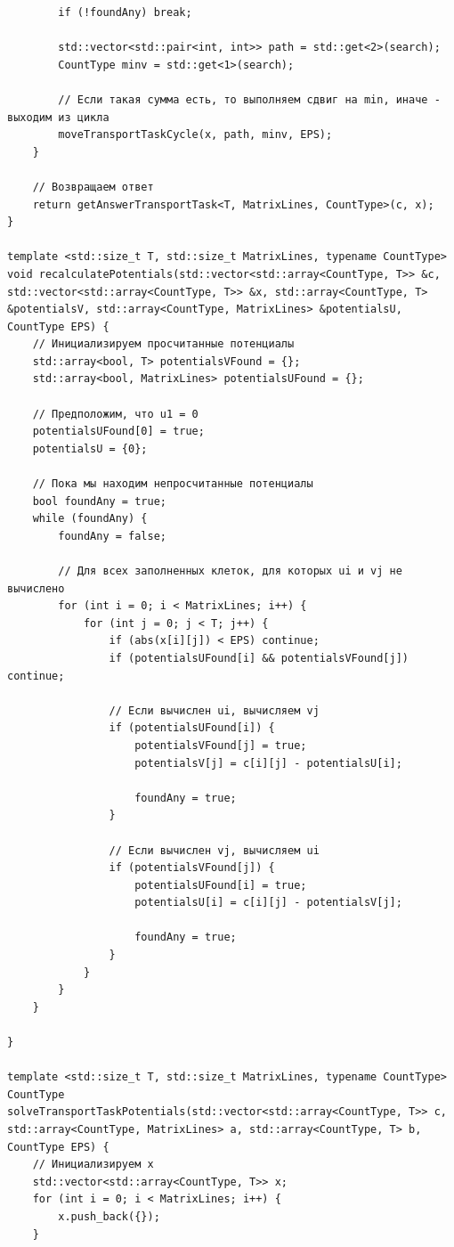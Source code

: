 \documentclass[a4paper,14pt]{extarticle}
\begin{document}
\begin{verbatim}
        if (!foundAny) break;

        std::vector<std::pair<int, int>> path = std::get<2>(search);
        CountType minv = std::get<1>(search);

        // Если такая сумма есть, то выполняем сдвиг на min, иначе - выходим из цикла
        moveTransportTaskCycle(x, path, minv, EPS);
    }

    // Возвращаем ответ
    return getAnswerTransportTask<T, MatrixLines, CountType>(c, x);
}

template <std::size_t T, std::size_t MatrixLines, typename CountType>
void recalculatePotentials(std::vector<std::array<CountType, T>> &c, std::vector<std::array<CountType, T>> &x, std::array<CountType, T> &potentialsV, std::array<CountType, MatrixLines> &potentialsU, CountType EPS) {
    // Инициализируем просчитанные потенциалы
    std::array<bool, T> potentialsVFound = {};
    std::array<bool, MatrixLines> potentialsUFound = {};

    // Предположим, что u1 = 0
    potentialsUFound[0] = true;
    potentialsU = {0};
    
    // Пока мы находим непросчитанные потенциалы
    bool foundAny = true;
    while (foundAny) {
        foundAny = false;

        // Для всех заполненных клеток, для которых ui и vj не вычислено
        for (int i = 0; i < MatrixLines; i++) {
            for (int j = 0; j < T; j++) {
                if (abs(x[i][j]) < EPS) continue;
                if (potentialsUFound[i] && potentialsVFound[j]) continue;

                // Если вычислен ui, вычисляем vj
                if (potentialsUFound[i]) {
                    potentialsVFound[j] = true;
                    potentialsV[j] = c[i][j] - potentialsU[i];

                    foundAny = true;
                }

                // Если вычислен vj, вычисляем ui
                if (potentialsVFound[j]) {
                    potentialsUFound[i] = true;
                    potentialsU[i] = c[i][j] - potentialsV[j];

                    foundAny = true;
                }
            }
        }
    }
    
}

template <std::size_t T, std::size_t MatrixLines, typename CountType>
CountType solveTransportTaskPotentials(std::vector<std::array<CountType, T>> c, std::array<CountType, MatrixLines> a, std::array<CountType, T> b, CountType EPS) {
    // Инициализируем x
    std::vector<std::array<CountType, T>> x;
    for (int i = 0; i < MatrixLines; i++) {
        x.push_back({});
    }


\end{verbatim}
\end{document}
